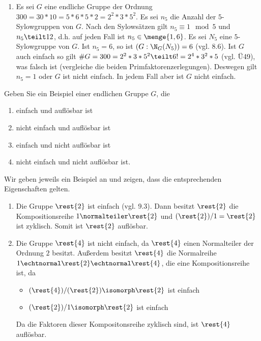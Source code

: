 \begin{exercisePage}
\begin{solution}
\begin{enumerate}[label=(\arabic*)]
			\item Es sei $G$ eine endliche Gruppe der Ordnung $300 = 30*10 = 5*6*5*2 = 2^2*3*5^2$. Es sei $n_5$ die Anzahl der $5$-Sylowgruppen von $G$. Nach den Sylowsätzen gilt $n_5 \equiv 1 \mod 5$ und $n_5 \teilt 12$, d.h. auf jeden Fall ist $n_5 \in \menge{1,6}$. Es sei $N_5$ eine $5$-Sylowgruppe von $G$. Ist $n_5 = 6$, so ist $(G:\N_G(N_5)) = 6$ (vgl. 8.6). Ist $G$ auch einfach so gilt $\# G = 300 = 2^2*3*5^2 \teilt 6! =2^4*3^2*5$ (vgl. Ü49), was falsch ist (vergleiche die beiden Primfaktorenzerlegungen). Deswegen gilt $n_5 = 1$ oder $G$ ist nicht einfach. In jedem Fall aber ist $G$ nicht einfach.
		\end{enumerate}
	\end{solution}
	
	\setcounter{taskcount}{80}
	\begin{exercise}[Präsenz]
		Geben Sie ein Beispiel einer endlichen Gruppe $G$, die
		\begin{enumerate}[nolistsep, label=(\roman*)]
			\item einfach und auflösbar ist
			\item nicht einfach und auflösbar ist
			\item einfach und nicht auflösbar ist
			\item nicht einfach und nicht auflösbar ist.
		\end{enumerate}
	\end{exercise}
	\begin{solution}
		Wir geben jeweils ein Beispiel an und zeigen, dass die entsprechenden Eigenschaften gelten.
		\begin{enumerate}[label=(\roman*)]
			\item Die Gruppe $\rest{2}$ ist einfach (vgl. 9.3). Dann besitzt $\rest{2}$ die Kompositionsreihe $1 \normalteiler \rest{2}$ und $(\rest{2})/1 = \rest{2}$ ist zyklisch. Somit ist $\rest{2}$ auflösbar.
			\item Die Gruppe $\rest{4}$ ist nicht einfach, da $\rest{4}$ einen Normalteiler der Ordnung $2$ besitzt. Außerdem besitzt $\rest{4}$ die Normalreihe $1 \echtnormal \rest{2} \echtnormal \rest{4}$, die eine Kompositionsreihe ist, da
			\begin{itemize}[label=$-$]
				\item $(\rest{4})/(\rest{2}) \isomorph \rest{2}$ ist einfach
				\item $(\rest{2})/1 \isomorph \rest{2}$ ist einfach
			\end{itemize}
			Da die Faktoren dieser Kompositonsreihe zyklisch sind, ist $\rest{4}$ auflösbar.

\end{enumerate}
\end{solution}
\end{exercisePage}
